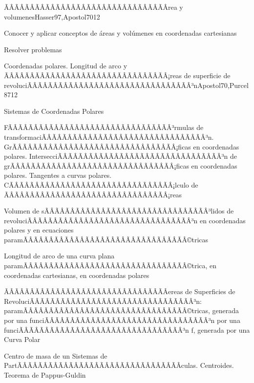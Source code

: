 \begin{sumilla}
\begin{unit}{ÃÂÃÂÃÂÃÂÃÂÃÂÃÂÃÂÃÂÃÂÃÂÃÂÃÂÃÂÃÂÃÂrea y volumenes}{Hasser97,Apostol70}{12}
\begin{objetivos}
	\item Conocer y aplicar conceptos de \'areas y vol\'umenes en coordenadas cartesianas
	\item Resolver problemas
\end{objetivos}
\end{unit}

\begin{unit}{Coordenadas polares. Longitud de arco y ÃÂÃÂÃÂÃÂÃÂÃÂÃÂÃÂÃÂÃÂÃÂÃÂÃÂÃÂÃÂÃÂ¡reas de superficie de revoluciÃÂÃÂÃÂÃÂÃÂÃÂÃÂÃÂÃÂÃÂÃÂÃÂÃÂÃÂÃÂÃÂ³n}{Apostol70,Purcel87}{12}
\begin{topicos}
	\item Sistemas de Coordenadas Polares
	\item FÃÂÃÂÃÂÃÂÃÂÃÂÃÂÃÂÃÂÃÂÃÂÃÂÃÂÃÂÃÂÃÂ³rmulas de transformaciÃÂÃÂÃÂÃÂÃÂÃÂÃÂÃÂÃÂÃÂÃÂÃÂÃÂÃÂÃÂÃÂ³n. GrÃÂÃÂÃÂÃÂÃÂÃÂÃÂÃÂÃÂÃÂÃÂÃÂÃÂÃÂÃÂÃÂ¡ficas en coordenadas polares. IntersecciÃÂÃÂÃÂÃÂÃÂÃÂÃÂÃÂÃÂÃÂÃÂÃÂÃÂÃÂÃÂÃÂ³n de grÃÂÃÂÃÂÃÂÃÂÃÂÃÂÃÂÃÂÃÂÃÂÃÂÃÂÃÂÃÂÃÂ¡ficas en coordenadas polares. Tangentes a curvas polares. CÃÂÃÂÃÂÃÂÃÂÃÂÃÂÃÂÃÂÃÂÃÂÃÂÃÂÃÂÃÂÃÂ¡lculo de ÃÂÃÂÃÂÃÂÃÂÃÂÃÂÃÂÃÂÃÂÃÂÃÂÃÂÃÂÃÂÃÂ¡reas
	\item Volumen de sÃÂÃÂÃÂÃÂÃÂÃÂÃÂÃÂÃÂÃÂÃÂÃÂÃÂÃÂÃÂÃÂ³lidos de revoluciÃÂÃÂÃÂÃÂÃÂÃÂÃÂÃÂÃÂÃÂÃÂÃÂÃÂÃÂÃÂÃÂ³n en coordenadas polares y en ecuaciones paramÃÂÃÂÃÂÃÂÃÂÃÂÃÂÃÂÃÂÃÂÃÂÃÂÃÂÃÂÃÂÃÂ©tricas
	\item Longitud de arco de una curva plana paramÃÂÃÂÃÂÃÂÃÂÃÂÃÂÃÂÃÂÃÂÃÂÃÂÃÂÃÂÃÂÃÂ©trica, en coordenadas cartesianas, en  coordenadas polares
	\item ÃÂÃÂÃÂÃÂÃÂÃÂÃÂÃÂÃÂÃÂÃÂÃÂÃÂÃÂÃÂÃÂereas de Superficies de RevoluciÃÂÃÂÃÂÃÂÃÂÃÂÃÂÃÂÃÂÃÂÃÂÃÂÃÂÃÂÃÂÃÂ³n: paramÃÂÃÂÃÂÃÂÃÂÃÂÃÂÃÂÃÂÃÂÃÂÃÂÃÂÃÂÃÂÃÂ©tricas,  generada por una funciÃÂÃÂÃÂÃÂÃÂÃÂÃÂÃÂÃÂÃÂÃÂÃÂÃÂÃÂÃÂÃÂ³n por una  funciÃÂÃÂÃÂÃÂÃÂÃÂÃÂÃÂÃÂÃÂÃÂÃÂÃÂÃÂÃÂÃÂ³n f, generada por una Curva  Polar
	\item Centro de masa de un Sistemas de PartÃÂÃÂÃÂÃÂÃÂÃÂÃÂÃÂÃÂÃÂÃÂÃÂÃÂÃÂÃÂÃÂ­culas. Centroides. Teorema de Pappus-Guldin
\end{topicos}


\end{unit}
\end{sumilla}
